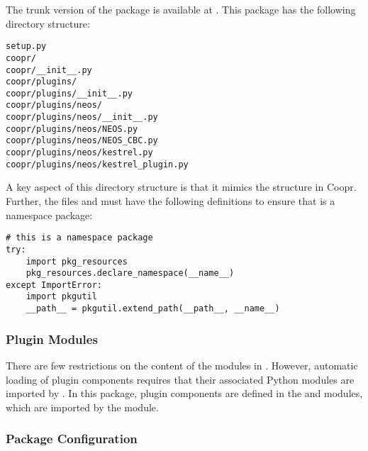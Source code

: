 The trunk version of the  package is available at\newline
{}.  This package has the following directory structure:
\begin{lstlisting}
setup.py
coopr/
coopr/__init__.py
coopr/plugins/
coopr/plugins/__init__.py
coopr/plugins/neos/
coopr/plugins/neos/__init__.py
coopr/plugins/neos/NEOS.py
coopr/plugins/neos/NEOS_CBC.py
coopr/plugins/neos/kestrel.py
coopr/plugins/neos/kestrel_plugin.py
\end{lstlisting}

A key aspect of this directory structure is that it mimics the structure in Coopr.  Further, the files  and  must have the following definitions to ensure that  is a 
namespace package:
\begin{lstlisting}
# this is a namespace package
try:
    import pkg_resources
    pkg_resources.declare_namespace(__name__)
except ImportError:
    import pkgutil
    __path__ = pkgutil.extend_path(__path__, __name__)
\end{lstlisting}


\subsubsection{Plugin Modules}

There are few restrictions on the content of the modules in
.  However, automatic loading of
plugin components requires that their associated Python modules are imported by .  In this package, plugin components are defined in the  and  modules, which are imported by the 
 module.


\subsubsection{Package Configuration}

